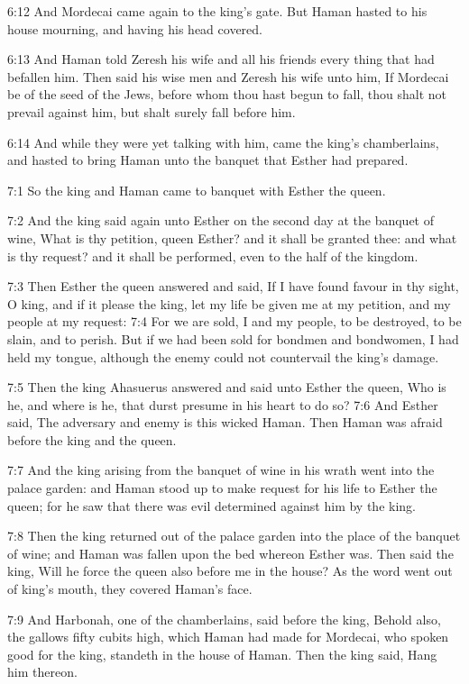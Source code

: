 6:12 And Mordecai came again to the king's gate. But Haman hasted to
his house mourning, and having his head covered.

6:13 And Haman told Zeresh his wife and all his friends every thing
that had befallen him. Then said his wise men and Zeresh his wife unto
him, If Mordecai be of the seed of the Jews, before whom thou hast
begun to fall, thou shalt not prevail against him, but shalt surely
fall before him.

6:14 And while they were yet talking with him, came the king's
chamberlains, and hasted to bring Haman unto the banquet that Esther
had prepared.

7:1 So the king and Haman came to banquet with Esther the queen.

7:2 And the king said again unto Esther on the second day at the
banquet of wine, What is thy petition, queen Esther? and it shall be
granted thee: and what is thy request? and it shall be performed, even
to the half of the kingdom.

7:3 Then Esther the queen answered and said, If I have found favour in
thy sight, O king, and if it please the king, let my life be given me
at my petition, and my people at my request: 7:4 For we are sold, I
and my people, to be destroyed, to be slain, and to perish. But if we
had been sold for bondmen and bondwomen, I had held my tongue,
although the enemy could not countervail the king's damage.

7:5 Then the king Ahasuerus answered and said unto Esther the queen,
Who is he, and where is he, that durst presume in his heart to do so?
7:6 And Esther said, The adversary and enemy is this wicked Haman.
Then Haman was afraid before the king and the queen.

7:7 And the king arising from the banquet of wine in his wrath went
into the palace garden: and Haman stood up to make request for his
life to Esther the queen; for he saw that there was evil determined
against him by the king.

7:8 Then the king returned out of the palace garden into the place of
the banquet of wine; and Haman was fallen upon the bed whereon Esther
was. Then said the king, Will he force the queen also before me in the
house? As the word went out of king's mouth, they covered Haman's
face.

7:9 And Harbonah, one of the chamberlains, said before the king,
Behold also, the gallows fifty cubits high, which Haman had made for
Mordecai, who spoken good for the king, standeth in the house of
Haman. Then the king said, Hang him thereon.

